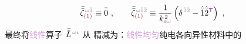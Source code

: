 \begin{align} \label{eq:zeta-restriction-L}
	\bar{\bar{\zeta}}^{\;\! \mathcolor{gray}{\omega} \mathcolor{gray}{\check{1}}}_{\textcolor{Maroon}{(1)}} \equiv \bar{\bar{0}} ~, ~~~~~~ \bar{\bar{\zeta}}^{\;\! \mathcolor{gray}{\omega} \mathcolor{gray}{\check{1} \check{2}}}_{\textcolor{Maroon}{(1)}} \equiv \frac{1}{k_{\textcolor{Maroon}{\mathsf{o}} \mathcolor{gray}{\omega}}^{\;\! 2}} \left( \delta^{\;\! \mathcolor{gray}{\check{1}} \mathcolor{gray}{\check{2}}} - \hat{\mathcolor{gray}{\check{1}}} \hat{\mathcolor{gray}{\check{2}}}^{\mathsf{\textcolor{Plum}{T}}} \right) ~,
\end{align}
最终将\textcolor{Plum}{线性}算子 $\Xint{\mathcolor{gray}{-}}{30}{\bar{\bar{L}}}^{\;\! \mathcolor{gray}{\omega} \textcolor{PineGreen}{\imath}}$ 从  精减为：\textcolor{Plum}{线性}\textcolor{Plum}{均匀}\textcolor{PineGreen}{纯电各向异性}材料中的
